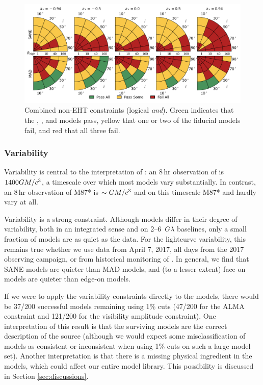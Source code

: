 \begin{figure}\label{fig:non_eht_cuts}
  \centering
  \includegraphics[width=\textwidth]{./figures/Non_Interferometric_Constraints.png}
  \caption{Combined non-EHT constraints (logical {\em and}).  Green indicates that the \kharma, \bhac, and \hamr models pass, yellow that one or two of the fiducial models fail, and red that all three fail.}
\end{figure}

\subsubsection{Variability}

Variability is central to  the interpretation of \sgra: an $8\,\mathrm{hr}$ observation of \sgra is $1400 GM/c^3$, a timescale over which most models vary substantially.  In contrast, an $8\,\mathrm{hr}$ observation of M87* is $\sim GM/c^3$ and on this timescale M87* and \sgra hardly vary at all.

Variability is a strong constraint.  Although models differ in their degree of variability, both in an integrated sense and on 2--6~$G\lambda$ baselines, only a small fraction of models are as quiet as the data.  For the lightcurve variability, this remains true whether we use data from April 7, 2017, all days from the 2017 observing campaign, or from historical monitoring of \sgra.   In general, we find that SANE models are quieter than MAD models, and (to a lesser extent) face-on models are quieter than edge-on models.

If we were to apply the variability constraints directly to the models, there would be 37/200 successful models remaining using 1\% cuts (47/200 for the ALMA constraint and 121/200 for the visibility amplitude constraint).  One interpretation of this result is that the surviving models are the correct description of the source (although we would expect some misclassification of models as consistent or inconsistent when using 1\% cuts on such a large model set).  Another interpretation is that there is a missing physical ingredient in the models, which could affect our entire model library. This possibility is discussed in Section \ref{sec:discussions}.

